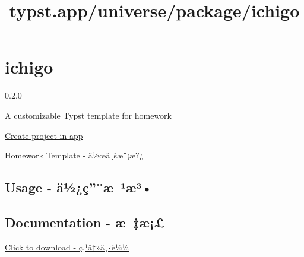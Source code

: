 \title{typst.app/universe/package/ichigo}

\label{banner}
\label{template-thumbnail}

\section{ichigo}\label{ichigo}

{ 0.2.0 }

A customizable Typst template for homework

\href{/app?template=ichigo&version=0.2.0}{Create project in app}

\label{readme}
Homework Template - ä½œä¸šæ¨¡æ?¿

\subsection{Usage -
ä½¿ç''¨æ--¹æ³•}\label{usage---uxe4uxbduxe7uxe6uxb9uxe6uxb3}

\begin{Shaded}
\begin{Highlighting}[]

\NormalTok{  author{-}info: [}
\NormalTok{  ],}
\NormalTok{)}

\NormalTok{\#prob[}
\NormalTok{][}
\NormalTok{    \}}
\NormalTok{  \}}
\NormalTok{]}
\end{Highlighting}
\end{Shaded}

\subsection{Documentation - æ--‡æ¡£}\label{documentation---uxe6uxe6}

\href{https://github.com/PKU-Typst/ichigo/releases/download/v0.2.0/documentation.pdf}{Click
to download - ç‚¹å‡»ä¸‹è½½}

